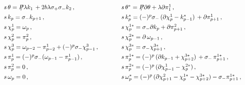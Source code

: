 \documentclass[a4paper,12pt]{article}
\begin{document}
\begin{eqnarray}  
\begin{array}{ll}
  s \,  \theta   =  \SL{P} \lambda k_1 \, + 2 b \lambda \sigma_+
    \sigma_- k_2 \,,  \hspace{1cm}      
   & s \,  \theta^*  =  \SL{P} \partial \theta + \lambda \partial
    \pi_1^1   \,,  \nonumber \vspace{.15cm}\\ 
  s  \,  k_p   =  \sigma_- k_{p+1} \,,   \hspace{1cm}    
   & s \,  k_p^*  = (-)^p \sigma_- \, ( \partial \chi_p^1 - 
    k_{p-1}^* )\, + \partial \pi_{p+1}^1 \,,  \nonumber
    \vspace{.15cm}\\ 
  s \,  \chi_p^1  =  \omega_p   \,,   \hspace{1cm} 
   & s \,  \chi_p^{1*}  =  \sigma_- \partial k_p + \partial
     \pi_{p+1}^2 \,, \nonumber \vspace{.15cm}\\ 
  s  \,  \chi_p^2  =  \pi_p^2  \,, \hspace{1cm}     
   & s \,  \chi_p^{2*}  =  \partial \, \omega_{p-1}  \,, \nonumber
    \vspace{.15cm}\\ 
  s  \,  \chi_p^3 =  \omega_{p-2} - \pi_{p-2}^1 + (-)^p \sigma_-
    \chi_{p-1}^3  \,, \hspace{1cm}      
   & s \,  \chi_p^{3*}  = \sigma_- \chi_{p+1}^{3*}  \,, \nonumber
    \vspace{.15cm}\\ 
  s  \,  \pi_p^1  = (-)^p \sigma_- (\omega_{p-1} - \pi_{p-1}^1 )  \,,
  \hspace{1cm}      
   & s \,  \pi_p^{1*}  = (-)^p \, (\partial k_{p-1} + \chi_{p+2}^{3*}
   ) \, + \sigma_- \, \pi_{p+1}^{1*}   
      \,, \nonumber \vspace{.15cm}\\ 
  s  \,  \pi^2_p  =  0   \,, \hspace{1cm}     
   & s \,  \pi_p^{2*}  =  (-)^p \, ( \partial \chi_{p-1}^1 - \chi_p^{2*} ) \,,
    \nonumber \vspace{.15cm}\\ 
  s  \,  \omega_p  =  0  \,, \hspace{1cm}     
   & s \,  \omega_p^*  =  (-)^p \, ( \partial \chi_{p+1}^2 -
   \chi_p^{1*} - 
    \chi_{p+2}^{3*} ) - \sigma_- \pi_{p+1}^{1*}  \,, 
\end{array} 
 \end{eqnarray}
%
 \\
\end{document}
